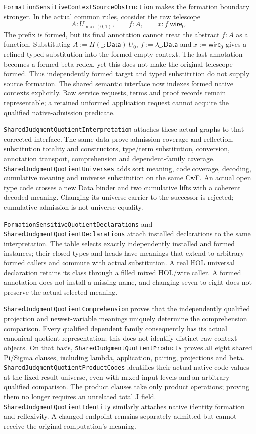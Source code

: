 \documentclass[11pt]{article}
\theoremstyle{definition}
\theoremstyle{remark}
\begin{document}
\nolinkurl{FormationSensitiveContextSourceObstruction} makes the formation
boundary stronger. In the actual common rules, consider the raw telescope
\[
 A:U_{\max(0,1)},\qquad f:A,\qquad x:f\;\mathsf{wire}_0.
\]
The prefix is formed, but its final annotation cannot treat the abstract
$f:A$ as a function. Substituting
$A:=\Pi(\_:\mathsf{Data}).U_0$, $f:=\lambda\_.\mathsf{Data}$ and
$x:=\mathsf{wire}_0$ gives a refined-typed substitution into the formed empty
context. The last annotation becomes a formed beta redex, yet this does not
make the original telescope formed. Thus independently formed target and
typed substitution do not supply source formation. The shared semantic
interface now indexes formed native contexts explicitly. Raw service requests,
terms and proof records remain representable; a retained unformed application
request cannot acquire the qualified native-admission predicate.

\nolinkurl{SharedJudgmentQuotientInterpretation} attaches these actual graphs
to that corrected interface. The same data prove admission coverage and
reflection, substitution totality and constructors, type/term substitution,
conversion, annotation transport, comprehension and dependent-family coverage.
\nolinkurl{SharedJudgmentQuotientUniverses} adds sort meaning, code coverage,
decoding, cumulative meaning and universe substitution on the same CwF.
An actual open type code crosses a new Data binder and two cumulative lifts
with a coherent decoded meaning. Changing its universe carrier to the
successor is rejected; cumulative admission is not universe equality.

\nolinkurl{FormationSensitiveQuotientDeclarations} and
\nolinkurl{SharedJudgmentQuotientDeclarations} attach installed declarations
to the same interpretation. The table selects exactly independently installed
and formed instances; their closed types and heads have meanings that extend
to arbitrary formed callers and commute with actual substitution. A real HOL
universal declaration retains its class through a filled mixed HOL/wire caller.
A formed annotation does not install a missing name, and changing seven to
eight does not preserve the actual selected meaning.

\nolinkurl{SharedJudgmentQuotientComprehension} proves that the independently
qualified projection and newest-variable meanings uniquely determine the
comprehension comparison. Every qualified dependent family consequently has
its actual canonical quotient representation; this does not identify distinct
raw context objects. On that basis,
\nolinkurl{SharedJudgmentQuotientProducts} proves all eight shared Pi/Sigma
clauses, including lambda, application, pairing, projections and beta.
\nolinkurl{SharedJudgmentQuotientProductCodes} identifies their actual native
code values at the fixed result universe, even with mixed input levels and
an arbitrary qualified comparison. The product clauses take only product
operations; proving them no longer requires an unrelated total J field.
\nolinkurl{SharedJudgmentQuotientIdentity} similarly attaches native identity
formation and reflexivity. A changed endpoint remains separately admitted
but cannot receive the original computation's meaning.
\end{document}
